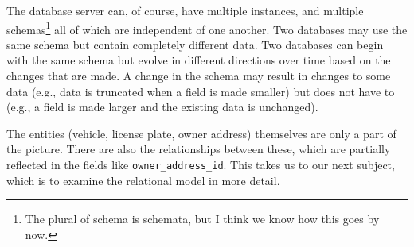 The database server can, of course, have multiple instances, and multiple schemas\footnote{The plural of schema is schemata, but I think we know how this goes by now.} all of which are independent of one another. Two databases may use the same schema but contain completely different data. Two databases can begin with the same schema but evolve in different directions over time based on the changes that are made. A change in the schema may result in changes to some data (e.g., data is truncated when a field is made smaller) but does not have to (e.g., a field is made larger and the existing data is unchanged).

The entities (vehicle, license plate, owner address) themselves are only a part of the picture. There are also the relationships between these, which are partially reflected in the fields like \texttt{owner\_address\_id}. This takes us to our next subject, which is to examine the relational model in more detail.






